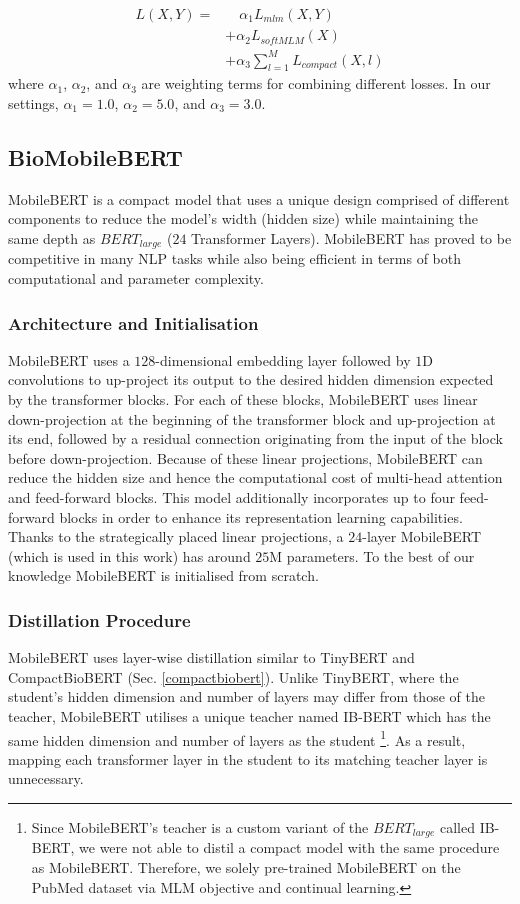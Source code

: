\documentclass{article}
\begin{document}
\begin{align}
    L(X , Y) = &\hspace{12pt}\alpha_{1}L_{mlm}(X , Y) \\
               & + \alpha_{2}L_{softMLM}(X) \nonumber \\ 
               & + \alpha_{3}\sum_{l=1}^M L_{compact}(X,l) \nonumber
\end{align}
where $\alpha_1$, $\alpha_2$, and $\alpha_3$ are weighting terms for combining different losses. In our settings, $\alpha_1 = 1.0$, $\alpha_2 = 5.0$, and $\alpha_3 = 3.0$.

\subsection{BioMobileBERT}
MobileBERT \citep{sun-etal-2020-mobilebert} is a compact model that uses a unique design comprised of different components to reduce the model's width (hidden size) while maintaining the same depth as $BERT_{large}$ ($24$ Transformer Layers). MobileBERT has proved to be competitive in many NLP tasks while also being efficient in terms of both computational and parameter complexity.

\subsubsection{Architecture and Initialisation}
MobileBERT uses a $128$-dimensional embedding layer followed by $1$D convolutions to up-project its output to the desired hidden dimension expected by the transformer blocks. For each of these blocks, MobileBERT uses linear down-projection at the beginning of the transformer block and up-projection at its end, followed by a residual connection originating from the input of the block before down-projection. Because of these linear projections, MobileBERT can reduce the hidden size and hence the computational cost of multi-head attention and feed-forward blocks. This model additionally incorporates up to four feed-forward blocks in order to enhance its representation learning capabilities. Thanks to the strategically placed linear projections, a $24$-layer MobileBERT (which is used in this work) has around $25$M parameters. To the best of our knowledge MobileBERT is initialised from scratch.

\subsubsection{Distillation Procedure}
MobileBERT uses layer-wise distillation similar to TinyBERT \citep{jiao-etal-2020-tinybert} and CompactBioBERT (Sec. \ref{compactbiobert}). Unlike TinyBERT, where the student's hidden dimension and number of layers may differ from those of the teacher, MobileBERT utilises a unique teacher named IB-BERT which has the same hidden dimension and number of layers as the student \footnote{Since MobileBERT's teacher is a custom variant of the $BERT_{large}$ called IB-BERT, we were not able to distil a compact model with the same procedure as MobileBERT. Therefore, we solely pre-trained MobileBERT on the PubMed dataset via MLM objective and continual learning.}. As a result, mapping each transformer layer in the student to its matching teacher layer is unnecessary.
\end{document}
